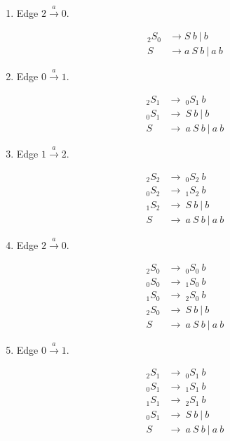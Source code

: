 \documentclass[12pt]{article}  %
\theoremstyle{definition}
\theoremstyle{remark}
\begin{document}
\begin{enumerate}

\item Edge $2 \xrightarrow{a} 0$.

\begin{align*}
_{2}S_0 & \rightarrow S \ b \ | \ b 
\\
S & \rightarrow a \ S \ b \ | \ a \ b 
\end{align*}


\item Edge $0 \xrightarrow{a} 1$.

\begin{align*}
_{2}S_1 & \rightarrow \ _{0}S_1 \ b 
\\
_{0}S_1 & \rightarrow \ S \ b \ | \ b 
\\
S & \rightarrow \ a \ S \ b \ | \ a \ b 
\end{align*}


\item Edge $1 \xrightarrow{a} 2$.

\begin{align*}
_{2}S_2 & \rightarrow \ _{0}S_2 \ b  
\\
_{0}S_2 & \rightarrow \ _{1}S_2 \ b  
\\
_{1}S_2 & \rightarrow \ S \ b \ | \ b 
\\
S & \rightarrow \ a \ S \ b \ | \ a \ b 
\end{align*}

\item Edge $2 \xrightarrow{a} 0$.

\begin{align*}
_{2}S_0 & \rightarrow \ _{0}S_0 \ b  
\\
_{0}S_0 & \rightarrow \ _{1}S_0 \ b  
\\
_{1}S_0 & \rightarrow \ _{2}S_0 \ b  
\\
_{2}S_0 & \rightarrow \ S \ b \ | \ b 
\\
S & \rightarrow \ a \ S \ b \ | \ a \ b 
\end{align*}

\item Edge $0 \xrightarrow{a} 1$.

\begin{align*}
_{2}S_1 & \rightarrow \ _{0}S_1 \ b  
\\
_{0}S_1 & \rightarrow \ _{1}S_1 \ b  
\\
_{1}S_1 & \rightarrow \ _{2}S_1 \ b  
\\
_{0}S_1 & \rightarrow \ S \ b \ | \ b 
\\
S & \rightarrow \ a \ S \ b \ | \ a \ b 
\end{align*}



\end{enumerate}
\end{document}
